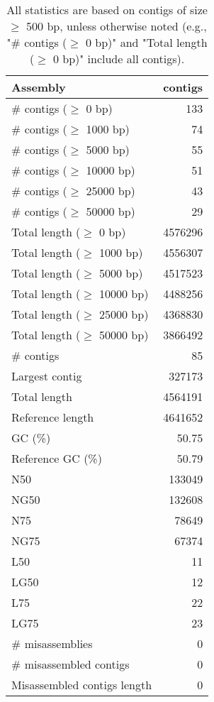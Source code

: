 \documentclass[12pt,a4paper]{article}
\begin{document}
\begin{table}[ht]
\begin{center}
\caption{All statistics are based on contigs of size $\geq$ 500 bp, unless otherwise noted (e.g., "\# contigs ($\geq$ 0 bp)" and "Total length ($\geq$ 0 bp)" include all contigs).}
\begin{tabular}{|l*{1}{|r}|}
\hline
Assembly & contigs \\ \hline
\# contigs ($\geq$ 0 bp) & 133 \\ \hline
\# contigs ($\geq$ 1000 bp) & 74 \\ \hline
\# contigs ($\geq$ 5000 bp) & 55 \\ \hline
\# contigs ($\geq$ 10000 bp) & 51 \\ \hline
\# contigs ($\geq$ 25000 bp) & 43 \\ \hline
\# contigs ($\geq$ 50000 bp) & 29 \\ \hline
Total length ($\geq$ 0 bp) & 4576296 \\ \hline
Total length ($\geq$ 1000 bp) & 4556307 \\ \hline
Total length ($\geq$ 5000 bp) & 4517523 \\ \hline
Total length ($\geq$ 10000 bp) & 4488256 \\ \hline
Total length ($\geq$ 25000 bp) & 4368830 \\ \hline
Total length ($\geq$ 50000 bp) & 3866492 \\ \hline
\# contigs & 85 \\ \hline
Largest contig & 327173 \\ \hline
Total length & 4564191 \\ \hline
Reference length & 4641652 \\ \hline
GC (\%) & 50.75 \\ \hline
Reference GC (\%) & 50.79 \\ \hline
N50 & 133049 \\ \hline
NG50 & 132608 \\ \hline
N75 & 78649 \\ \hline
NG75 & 67374 \\ \hline
L50 & 11 \\ \hline
LG50 & 12 \\ \hline
L75 & 22 \\ \hline
LG75 & 23 \\ \hline
\# misassemblies & 0 \\ \hline
\# misassembled contigs & 0 \\ \hline
Misassembled contigs length & 0 \\ \hline

\end{tabular}
\end{center}
\end{table}
\end{document}
